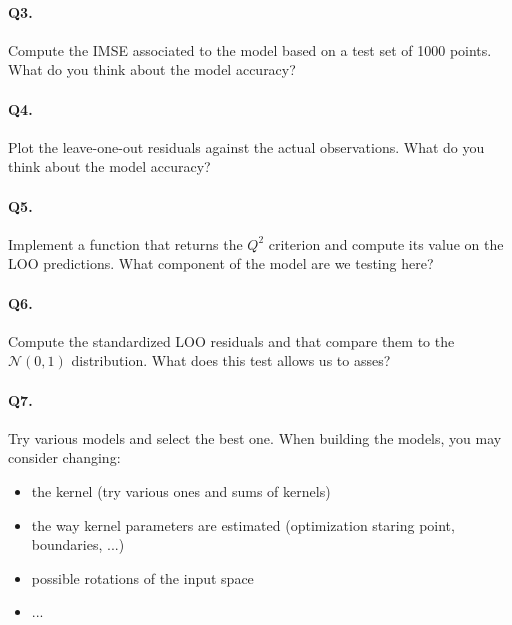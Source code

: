 \documentclass[12pt]{scrartcl}
\begin{document}
\paragraph{Q3.}
Compute the IMSE associated to the model based on a test set of 1000 points. What do you think about the model accuracy?

\paragraph{Q4.}
Plot the leave-one-out residuals against the actual observations. What do you think about the model accuracy?

\paragraph{Q5.}
Implement a function that returns the $Q^2$ criterion and compute its value on the LOO predictions. What component of the model are we testing here?

\paragraph{Q6.}
Compute the standardized LOO residuals and that compare them to the $\mathcal{N}(0,1)$ distribution. What does this test allows us to asses?

\paragraph{Q7.} Try various models and select the best one. When building the models, you may consider changing:
\begin{itemize}
   	\item the kernel (try various ones and sums of kernels)
   	\item the way kernel parameters are estimated (optimization staring point, boundaries, ...)
   	\item possible rotations of the input space
   	\item ...
\end{itemize}
\end{document}
